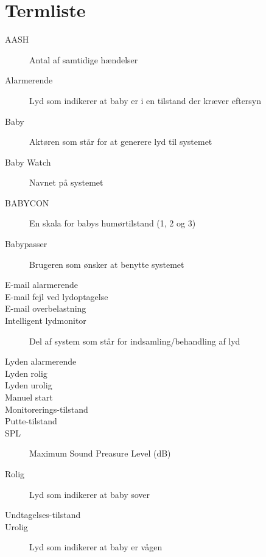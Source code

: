 \chapter{Termliste}


\begin{description}
\item[AASH] Antal af samtidige hændelser
\item[Alarmerende] Lyd som indikerer at baby er i en tilstand der kræver eftersyn
\item[Baby] Aktøren som står for at generere lyd til systemet
\item[Baby Watch] Navnet på systemet
\item[BABYCON] En skala for babys humørtilstand (1, 2 og 3)
\item[Babypasser] Brugeren som ønsker at benytte systemet
\item[E-mail alarmerende]
\item[E-mail fejl ved lydoptagelse]
\item[E-mail overbelastning] 
\item[Intelligent lydmonitor] Del af system som står for indsamling/behandling af lyd
\item[Lyden alarmerende]
\item[Lyden rolig]
\item[Lyden urolig]
\item[Manuel start]
\item[Monitorerings-tilstand]
\item[Putte-tilstand]
\item[SPL] Maximum Sound Preasure Level (dB)
\item[Rolig] Lyd som indikerer at baby sover
\item[Undtagelses-tilstand]
\item[Urolig] Lyd som indikerer at baby er vågen




\end{description}